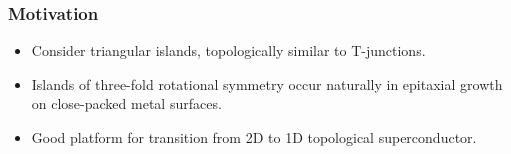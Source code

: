 \documentclass[xcolor=dvipsnames,10pt,aspectratio=169]{beamer}
\newcommand{\MO}{Motivation}
\begin{document}
  \begin{frame}
    \frametitle{\MO}
    \begin{multicols}{2}

    \begin{itemize}
      \item Consider triangular islands, topologically similar to T-junctions.
      \item Islands of three-fold rotational symmetry occur naturally in epitaxial growth on close-packed metal surfaces.
      \item Good platform for transition from 2D to 1D topological superconductor.
    \end{itemize}
    \newline

    \begin{figure}
      \end{figure}
    \end{multicols}

  \end{frame}
\end{document}
